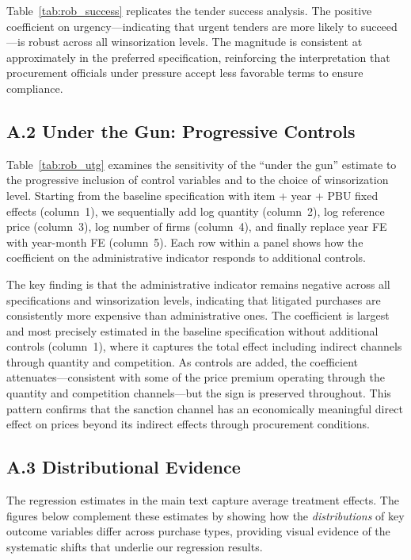 
Table~\ref{tab:rob_success} replicates the tender success analysis. The positive coefficient on urgency---indicating that urgent tenders are more likely to succeed---is robust across all winsorization levels. The magnitude is consistent at approximately \BProbSuccessPP{} in the preferred specification, reinforcing the interpretation that procurement officials under pressure accept less favorable terms to ensure compliance.


\subsection*{A.2 Under the Gun: Progressive Controls}

Table~\ref{tab:rob_utg} examines the sensitivity of the ``under the gun'' estimate to the progressive inclusion of control variables and to the choice of winsorization level. Starting from the baseline specification with item + year + PBU fixed effects (column~1), we sequentially add log quantity (column~2), log reference price (column~3), log number of firms (column~4), and finally replace year FE with year-month FE (column~5). Each row within a panel shows how the coefficient on the administrative indicator responds to additional controls.

The key finding is that the administrative indicator remains negative across all specifications and winsorization levels, indicating that litigated purchases are consistently more expensive than administrative ones. The coefficient is largest and most precisely estimated in the baseline specification without additional controls (column~1), where it captures the total effect including indirect channels through quantity and competition. As controls are added, the coefficient attenuates---consistent with some of the price premium operating through the quantity and competition channels---but the sign is preserved throughout. This pattern confirms that the sanction channel has an economically meaningful direct effect on prices beyond its indirect effects through procurement conditions.


\subsection*{A.3 Distributional Evidence}

The regression estimates in the main text capture average treatment effects. The figures below complement these estimates by showing how the \textit{distributions} of key outcome variables differ across purchase types, providing visual evidence of the systematic shifts that underlie our regression results.

